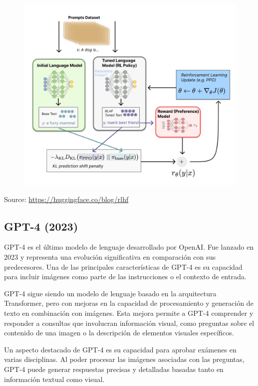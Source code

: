 \begin{figure}[h]
        	\includegraphics[scale = 0.12]{pics/RLHF.png}
        \end{figure}
        Source: \url{https://huggingface.co/blog/rlhf}



\subsection{GPT-4 (2023)}
GPT-4 \cite{openai2023gpt4} es el último modelo de lenguaje desarrollado por OpenAI. Fue lanzado en 2023 y representa una evolución significativa en comparación con sus predecesores. Una de las principales características de GPT-4 es su capacidad para incluir imágenes como parte de las instrucciones o el contexto de entrada.

GPT-4 sigue siendo un modelo de lenguaje basado en la arquitectura Transformer, pero con mejoras en la capacidad de procesamiento y generación de texto en combinación con imágenes. Esta mejora permite a GPT-4 comprender y responder a consultas que involucran información visual, como preguntas sobre el contenido de una imagen o la descripción de elementos visuales específicos.

Un aspecto destacado de GPT-4 es su capacidad para aprobar exámenes en varias disciplinas. Al poder procesar las imágenes asociadas con las preguntas, GPT-4 puede generar respuestas precisas y detalladas basadas tanto en información textual como visual.


